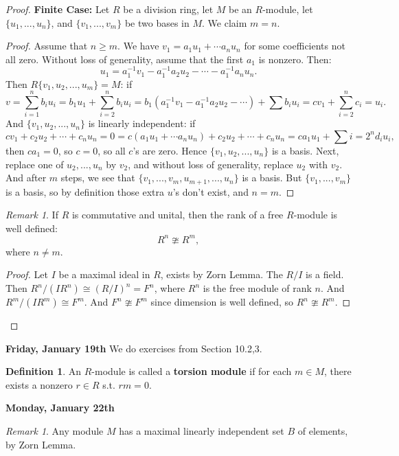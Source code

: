 \documentclass[9pt,reqno,twoside]{amsbook}
\theoremstyle{plain}
\numberwithin{section}{chapter}
\numberwithin{equation}{chapter}
\theoremstyle{definition}
\newtheorem{Def}[theorem]{Definition}
\theoremstyle{remark}
\newtheorem{rem}[theorem]{Remark}
\theoremstyle{plain}
\renewcommand{\geq}{\geqslant}
\begin{document}
\begin{proof}
\textbf{Finite Case: } Let $R$ be a division ring, let $M$ be an $R$-module, let $\{u_1,...,u_n\}$, and $\{v_1,...,v_m\}$ be two bases in $M$. We claim $m = n$. 
\begin{proof}
Assume that $n \geq m$. We have $v_1 = a_1u_1 + \cdots a_nu_n$ for some coefficients not all zero. Without loss of generality, assume that the first $a_1$ is nonzero. Then:
$$
u_1 = a_1^{-1}v_1 - a_1^{-1}a_2u_2 - \cdots - a_1^{-1}a_nu_n.
$$
Then $R\{v_1,u_2,...,u_m\} = M$: if 
$$
v = \sum_{i = 1}^n b_i u_i = b_1u_1 + \sum_{i = 2}^n b_iu_i = b_1(a_1^{-1}v_1 - a_1^{-1}a_2u_2 - \cdots) + \sum b_i u_i = cv_1 + \sum_{i = 2}^n c_i = u_i.
$$
And $\{v_1,u_2,...,u_n\}$ is linearly independent: if 
$$
cv_1 + c_2u_2 + \cdots + c_nu_n = 0 = c(a_1u_1 + \cdots a_nu_n) + c_2u_2 + \cdots + c_nu_n = ca_1 u_1 + \sum{i = 2}^n d_iu_i,
$$
then $ca_1 = 0$, so $c = 0$, so all $c$'s are zero. Hence $\{v_1,u_2,...,u_n\}$ is a basis. Next, replace one of $u_2,...,u_n$ by $v_2$, and without loss of generality, replace $u_2$ with $v_2$. And after $m$ steps, we see that $\{v_1,...,v_m,u_{m + 1},...,u_n\}$ is a basis. But $\{v_1,...,v_m\}$ is a basis, so by definition those extra $u$'s don't exist, and $n = m$. 
\end{proof}
\begin{rem}
If $R$ is commutative and unital, then the rank of a free $R$-module is well defined: 
$$
R^n \ncong R^m,
$$
where $n \neq m$. 
\end{rem}
\begin{proof}
Let $I$ be a maximal ideal in $R$, exists by Zorn Lemma. The $R/I$ is a field. Then $R^n/(IR^n) \cong (R/I)^n = F^n$, where $R^n$ is the free module of rank $n$. And $R^m/(IR^m) \cong F^m$. And $F^n \ncong F^m$ since dimension is well defined, so $R^n \ncong R^m$. 
\end{proof}
\end{proof}

\textbf{Friday, January 19th}
\vspace{5mm}
We do exercises from Section 10.2,3. 

\begin{Def}
An $R$-module is called a \textbf{torsion module} if for each $m \in M$, there exists a nonzero $r \in R$ s.t. $rm = 0$. 
\end{Def}


\textbf{Monday, January 22th}
\vspace{5mm}

\begin{rem}
Any module $M$ has a maximal linearly independent set $B$ of elements, by Zorn Lemma. 
\end{rem}
\end{document}
